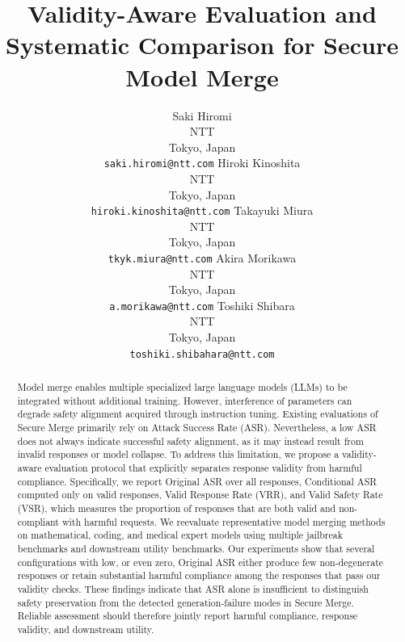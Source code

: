 \documentclass{article}
\title{Validity-Aware Evaluation and Systematic Comparison for Secure Model Merge}
\author{%
  Saki Hiromi \\
  NTT \\
  Tokyo, Japan \\
  \texttt{saki.hiromi@ntt.com}
  \And
  Hiroki Kinoshita \\
  NTT \\
  Tokyo, Japan \\
  \texttt{hiroki.kinoshita@ntt.com}
  \And
  Takayuki Miura \\
  NTT \\
  Tokyo, Japan \\
  \texttt{tkyk.miura@ntt.com}
  \And
  Akira Morikawa \\
  NTT \\
  Tokyo, Japan \\
  \texttt{a.morikawa@ntt.com}
  \And
  Toshiki Shibara \\
  NTT \\
  Tokyo, Japan \\
  \texttt{toshiki.shibahara@ntt.com}
}
\begin{document}
\maketitle


\begin{abstract}
    Model merge enables multiple specialized large language models (LLMs) to be integrated without additional training. However, interference of parameters can degrade safety alignment acquired through instruction tuning. Existing evaluations of Secure Merge primarily rely on Attack Success Rate (ASR). Nevertheless, a low ASR does not always indicate successful safety alignment, as it may instead result from invalid responses or model collapse. To address this limitation, we propose a validity-aware evaluation protocol that explicitly separates response validity from harmful compliance. Specifically, we report Original ASR over all responses, Conditional ASR computed only on valid responses, Valid Response Rate (VRR), and Valid Safety Rate (VSR), which measures the proportion of responses that are both valid and non-compliant with harmful requests. We reevaluate representative model merging methods on mathematical, coding, and medical expert models using multiple jailbreak benchmarks and downstream utility benchmarks. Our experiments show that several configurations with low, or even zero, Original ASR either produce few non-degenerate responses or retain substantial harmful compliance among the responses that pass our validity checks. These findings indicate that ASR alone is insufficient to distinguish safety preservation from the detected generation-failure modes in Secure Merge. Reliable assessment should therefore jointly report harmful compliance, response validity, and downstream utility.
\end{abstract}
\end{document}
